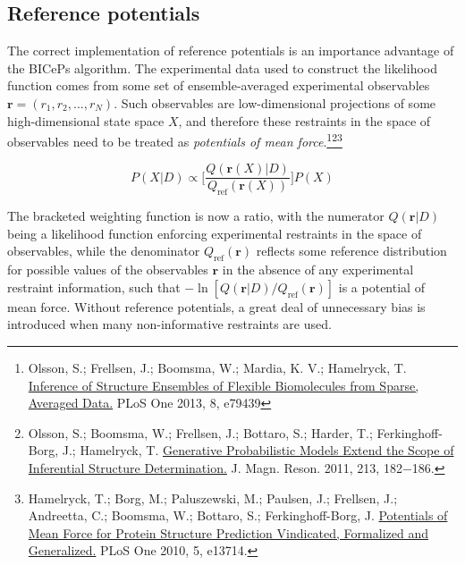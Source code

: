 \hypertarget{reference-potentials}{%
\subsection{Reference potentials}\label{reference-potentials}}

The correct implementation of reference potentials is an importance
advantage of the BICePs algorithm. The experimental data used to
construct the likelihood function comes from some set of
ensemble-averaged experimental observables
\(\mathbf{r} = (r_1, r_2, ..., r_N)\). Such observables are
low-dimensional projections of some high-dimensional state space \(X\),
and therefore these restraints in the space of observables need to be
treated as \emph{potentials of mean force}.\footnote{Olsson, S.;
  Frellsen, J.; Boomsma, W.; Mardia, K. V.; Hamelryck, T.
  \href{http://journals.plos.org/plosone/article?id=10.1371/journal.pone.0079439}{Inference
  of Structure Ensembles of Flexible Biomolecules from Sparse, Averaged
  Data.} PLoS One 2013, 8, e79439}\footnote{Olsson, S.; Boomsma, W.;
  Frellsen, J.; Bottaro, S.; Harder, T.; Ferkinghoff-Borg, J.;
  Hamelryck, T.
  \href{https://www.sciencedirect.com/science/article/pii/S1090780711003090?via\%3Dihub}{Generative
  Probabilistic Models Extend the Scope of Inferential Structure
  Determination.} J. Magn. Reson. 2011, 213, 182−186.}\footnote{Hamelryck,
  T.; Borg, M.; Paluszewski, M.; Paulsen, J.; Frellsen, J.; Andreetta,
  C.; Boomsma, W.; Bottaro, S.; Ferkinghoff-Borg, J.
  \href{http://journals.plos.org/plosone/article?id=10.1371/journal.pone.0013714}{Potentials
  of Mean Force for Protein Structure Prediction Vindicated, Formalized
  and Generalized.} PLoS One 2010, 5, e13714.}

\[P(X | D) \propto \bigg[ \frac{Q(\mathbf{r}(X)|D)}{Q_{\text{ref}}(\mathbf{r}(X))} \bigg] P(X)\]

The bracketed weighting function is now a ratio, with the numerator
\(Q(\mathbf{r}|D)\) being a likelihood function enforcing experimental
restraints in the space of observables, while the denominator
\(Q_{\text{ref}}(\mathbf{r})\) reflects some reference distribution for
possible values of the observables \(\mathbf{r}\) in the absence of any
experimental restraint information, such that
\(-\ln [Q(\mathbf{r}|D)/Q_{\text{ref}}(\mathbf{r})]\) is a potential of
mean force. Without reference potentials, a great deal of unnecessary
bias is introduced when many non-informative restraints are used.

